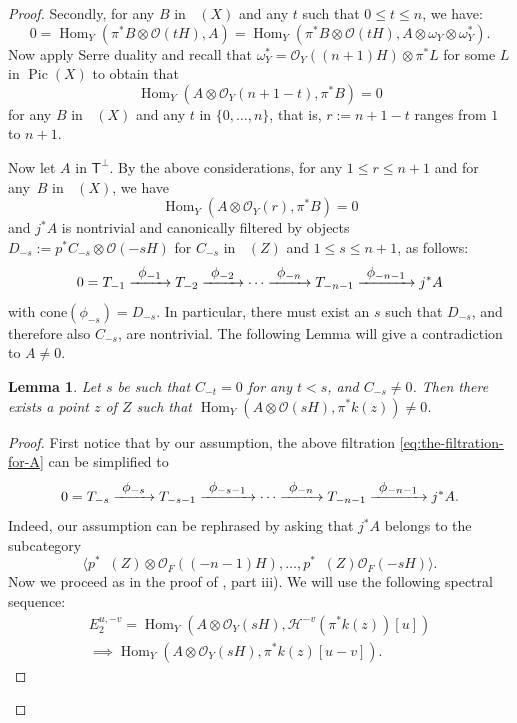 \documentclass[11pt]{article}
\newcommand{\To}[1]{\mathchoice{\xrightarrow{\textstyle\kern4pt#1\kern3pt}}{\stackrel{#1}{\longrightarrow}}{}{}}
\newcommand{\cone}{\mathrm{cone}}
\let\mathcal\mathscr
\theoremstyle{plain}
\newtheorem{lemma}[theorem]{Lemma}
\theoremstyle{definition}
\newcommand{\cat}[1]{\mathsf{#1}}
\newcommand{\sod}[1]{\langle #1 \rangle}
\DeclareMathOperator{\Db}{{\cat{D}^{\mathrm{b}}}}
\DeclareMathOperator{\Hom}{Hom}
\DeclareMathOperator{\Pic}{Pic}
\newcommand{\sheaf}[1]{\mathcal{#1}}
\newcommand{\kh}{\sheaf{H}}
\newcommand{\ko}{\sheaf{O}}\let\OO\ko\let\cO\ko
\begin{document}
\begin{proof}
Secondly, for any $B$ in $\Db(X)$ and any $t$ such that $0 \leq t \leq n$, we have:
\[
0=\Hom_Y(\pi^* B \otimes \ko(tH),A)=\Hom_Y(\pi^* B \otimes \ko(tH),A\otimes \omega_Y \otimes \omega_Y^*).
\]
Now apply Serre duality and recall that $\omega_Y^* = \ko_Y((n+1)H) \otimes \pi^* L$ for some $L$ in $\Pic(X)$ to obtain that
\[
\Hom_Y(A \otimes \ko_Y(n+1-t),\pi^* B) = 0
\]
for any $B$ in $\Db(X)$ and any $t$ in $\{0,\dots,n\}$, that is, $r:=n+1-t$ ranges from $1$ to $n+1$.

Now let $A$ in $\cat{T}^\perp$. By the above considerations, for any $1 \leq r \leq n+1$ and for any~$B$
in $\Db(X)$, we have
\begin{equation*}\label{eq:another-necessary-vanishing}
\Hom_Y(A\otimes\ko_Y(r),\pi^*B)= 0
\end{equation*}
and $j^*A$ is nontrivial and canonically filtered by objects $D_{-s}:=p^*C_{-s} \otimes \ko(-s H)$ for
$C_{-s}$ in $\Db(Z)$ and $1 \leq s \leq n+1$, as follows:
\begin{equation*}\label{eq:the-filtration-for-A}
0 = T_{-1} \To{\phi_{-1}}  T_{-2} \To{\phi_{-2}} \cdots \To{\phi_{-n}}  T_{-n-1} \To{\phi_{-n-1}}  j^*A
\end{equation*}
with $\cone(\phi_{-s}) = D_{-s}$.
In particular, there must exist an $s$ such that
$D_{-s}$, and therefore also $C_{-s}$, are nontrivial. The following Lemma will give a contradiction to $A \neq 0$.

\begin{lemma}
Let $s$ be such that $C_{-t}=0$ for any $t < s$, and $C_{-s} \neq 0$.
Then there exists a point $z$ of $Z$ such that $\Hom_Y(A \otimes \ko(sH),\pi^*k(z)) \neq 0$.
\end{lemma}

\begin{proof}
First notice that by our assumption, the above filtration \eqref{eq:the-filtration-for-A}
can be simplified to\vspace*{-3pt}
\begin{equation*}\label{eq:the-2nd-filtration-for-A}
0 = T_{-s} \To{\phi_{-s}} T_{-s-1} \To{\phi_{-s-1}} \cdots \To{\phi_{-n}} T_{-n-1} \To{\phi_{-n-1}} j^*A.
\end{equation*}
Indeed, our assumption can be rephrased by asking that $j^*A$ belongs to the subcategory\vspace*{-3pt}
\[
\sod{p^* \Db(Z) \otimes \ko_F((-n-1)H),\ldots,p^* \Db(Z) \ko_F(-sH)}.
\]
Now we proceed as in the proof of \cite[Prop.\,11.18]{Huybook}, part iii). We will use the following spectral sequence:\vspace*{-3pt}
\begin{multline*}\label{eq:the-spect-seq-in-the-lemma}
E_2^{u,-v} = \Hom_Y(A \otimes \ko_Y(sH),\kh^{-v}( \pi^* k(z))[u])\\ \implies \Hom_Y(A\otimes \ko_Y(sH), \pi^*k(z)[u-v]).
\end{multline*}


\end{proof}
\end{proof}
\end{document}
